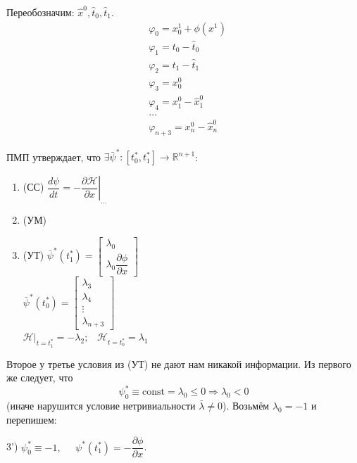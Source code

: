 \documentclass[12pt, a4paper]{article}
\theoremstyle{rusdef}
\newcommand{\R}{\ensuremath{\mathbb{R}}} %
\renewcommand{\H}{\mathcal{H}} %
\renewcommand{\d}{\partial} %
\DeclareMathOperator*{\thus}{\Rightarrow} %
\begin{document}
Переобозначим: $\hat{x}^0, \hat{t}_0, \hat{t}_1$.
$$
\begin{aligned}
& \varphi_0 = x^1_0 + \phi(x^1) \\
& \varphi_1 = t_0 - \hat{t}_0 \\
& \varphi_2 = t_1 - \hat{t}_1 \\
& \varphi_3 = x^0_0 \\
& \varphi_4 = x^0_1 - \hat{x}^0_1 \\
& \ldots \\
& \varphi_{n+3} = x^0_n - \hat{x}^0_n
\end{aligned}
$$

ПМП утверждает, что $\exists \bar{\psi}^* \colon [t^*_0, t^*_1] \to \R^{n+1}$:
\begin{enumerate}
\item (СС) $\dfrac{d\psi}{dt} = \left. -\dfrac{\d \H}{\d x} \right|_{...}$
\item (УМ)
\item (УТ) $\bar{\psi}^*(t^*_1) = \left[ \begin{matrix} \lambda_0 \\ \lambda_0 \dfrac{\d \phi}{\d x} \end{matrix} \right]$\\
		   $\bar{\psi}^*(t^*_0) = \left[ \begin{matrix} \lambda_3 \\ \lambda_4 \\ \vdots \\ \lambda_{n+3} \end{matrix} \right]$\\
		   $\H |_{t = t^*_1} = -\lambda_2; \;\;\; \H _{t = t^*_0} = \lambda_1$
\end{enumerate}

Второе у третье условия из (УТ) не дают нам никакой информации. Из первого же следует, что
$$
\psi^*_0 \equiv \mathrm{const} = \lambda_0 \leqslant 0 \thus \lambda_0 < 0
$$
(иначе нарушится условие нетривиальности $\bar{\lambda} \neq 0$).
Возьмём $\lambda_0 = -1$ и перепишем:

3') $\psi^*_0 \equiv -1, \;\;\;\;\; \psi^*(t^*_1) = -\dfrac{\d \phi}{\d x}$.
\end{document}
